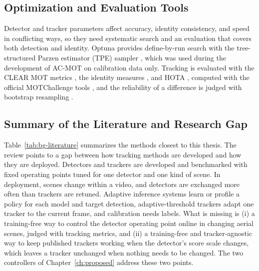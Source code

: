 \subsection{Optimization and Evaluation Tools}
Detector and tracker parameters affect accuracy, identity consistency, and speed in conflicting ways, so they need systematic search and an evaluation that covers both detection and identity. Optuna provides define-by-run search with the tree-structured Parzen estimator (TPE) sampler \cite{akiba2019optuna}, which was used during the development of AC-MOT on calibration data only. Tracking is evaluated with the CLEAR MOT metrics \cite{bernardin2008clear}, the identity measures \cite{ristani2016idf1}, and HOTA \cite{luiten2021hota}, computed with the official MOTChallenge tools \cite{dendorfer2021motchallenge}, and the reliability of a difference is judged with bootstrap resampling \cite{efron1993bootstrap}.

\subsection{Summary of the Literature and Research Gap}\label{sec:bg-gap}
Table~\ref{tab:bg-literature} summarizes the methods closest to this thesis. The review points to a gap between how tracking methods are developed and how they are deployed. Detectors and trackers are developed and benchmarked with fixed operating points tuned for one detector and one kind of scene. In deployment, scenes change within a video, and detectors are exchanged more often than trackers are retuned. Adaptive inference systems learn or profile a policy for each model and target detection, adaptive-threshold trackers adapt one tracker to the current frame, and calibration needs labels. What is missing is (i) a training-free way to control the detector operating point online in changing aerial scenes, judged with tracking metrics, and (ii) a training-free and tracker-agnostic way to keep published trackers working when the detector's score scale changes, which leaves a tracker unchanged when nothing needs to be changed. The two controllers of Chapter~\ref{ch:proposed} address these two points.

